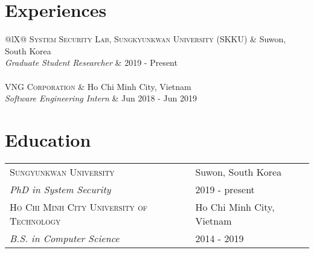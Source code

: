 \documentclass[a4paper,12pt]{article}
\begin{document}
\section{Experiences}
\begin{tabularx}{\linewidth}{@{}lX@{}}
	\textsc{System Security Lab, Sungkyunkwan University (SKKU)} & \hfill Suwon, South Korea        \\
	\emph{Graduate Student Researcher}                           & \hfill  2019 - Present           \\
	                                                                \\
	\textsc{VNG Corporation}                                     & \hfill Ho Chi Minh City, Vietnam \\
	\emph{Software Engineering Intern}                           & \hfill  Jun 2018 - Jun 2019      \\
\end{tabularx}

\section{Education}
\begin{tabularx}{\linewidth}{@{}lX@{}}
	\textsc{Sungyunkwan University}                    & \hfill Suwon, South Korea        \\
	\emph{PhD in System Security}                      & \hfill  2019 - present           \\
	\textsc{Ho Chi Minh City University of Technology} & \hfill Ho Chi Minh City, Vietnam \\
	\emph{B.S. in Computer Science}                    & \hfill  2014 - 2019              \\
\end{tabularx}
\end{document}
